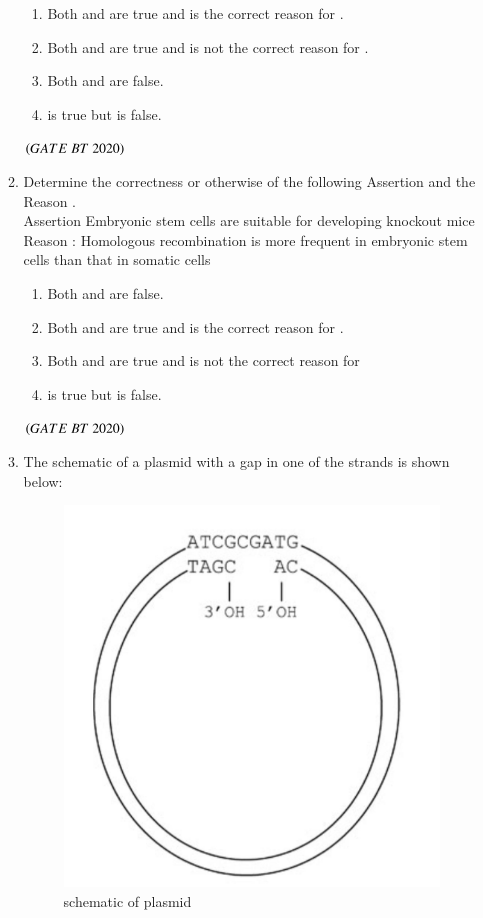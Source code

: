 \documentclass[journal,12pt,onecolumn]{IEEEtran}
\theoremstyle{remark}
\begin{document}
\begin{enumerate}[label=Q\arabic*:]
\begin{enumerate}[label=Q\arabic*:, start=26, leftmargin=2em]
\begin{enumerate}[label=\alph*)]
\item\;Both  and   are true and  is the correct reason for  .
\item\;Both    and   are true and  is not the correct reason for  .
\item\;Both    and   are false.
\item\;  is true but   is  false.

\end{enumerate}

\hfill$\left(GATE\ BT\ 2020\right)$

\item Determine the correctness or otherwise of the following Assertion  and the Reason .\\
Assertion  Embryonic stem cells are suitable for developing knockout mice\\
Reason : Homologous recombination is more frequent in embryonic stem cells than that in somatic cells

\begin{enumerate}[label=\alph*)]
\item\;Both  and   are false.
\item\;Both and   are true and  is the correct reason for  .
\item\;Both  and   are true and  is not the correct reason for  
\item\; is true but is  false.
\end{enumerate} 

\hfill$\left(GATE\ BT\ 2020\right)$


\item The schematic of a plasmid with a gap in one of the strands is shown below:
\begin{figure}[H]
\includegraphics[width=0.3\columnwidth]{figs/figure.jpeg}
\caption{schematic of plasmid}
\label{figure}
\end{figure}


\end{enumerate}
\end{enumerate}
\end{document}
